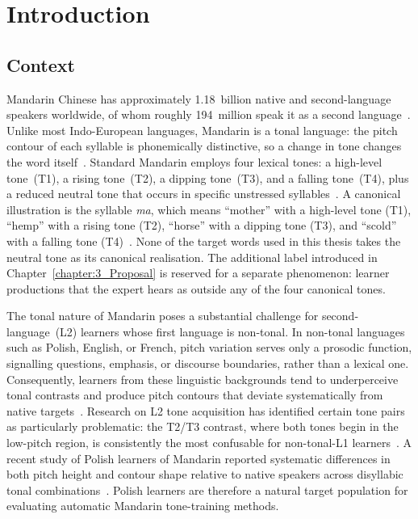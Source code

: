 
\chapter{Introduction}\label{chapter:1_Introduction}

\section{Context}
\label{sec:intro:context}

Mandarin Chinese has approximately 1.18~billion native and second-language speakers worldwide, of whom roughly 194~million speak it as a second language~\cite{ethnologue2025}. Unlike most Indo-European languages, Mandarin is a tonal language: the pitch contour of each syllable is phonemically distinctive, so a change in tone changes the word itself~\cite{jongman2006tones}. Standard Mandarin employs four lexical tones: a high-level tone~(T1), a rising tone~(T2), a dipping tone~(T3), and a falling tone~(T4), plus a reduced neutral tone that occurs in specific unstressed syllables~\cite{zahner2022toneexperience}. A canonical illustration is the syllable \textit{ma}, which means ``mother'' with a high-level tone (T1), ``hemp'' with a rising tone (T2), ``horse'' with a dipping tone (T3), and ``scold'' with a falling tone (T4)~\cite{jongman2006tones}. None of the target words used in this thesis takes the neutral tone as its canonical realisation. The additional label introduced in Chapter~\ref{chapter:3_Proposal} is reserved for a separate phenomenon: learner productions that the expert hears as outside any of the four canonical tones.

The tonal nature of Mandarin poses a substantial challenge for second-language~(L2) learners whose first language is non-tonal. In non-tonal languages such as Polish, English, or French, pitch variation serves only a prosodic function, signalling questions, emphasis, or discourse boundaries, rather than a lexical one. Consequently, learners from these linguistic backgrounds tend to underperceive tonal contrasts and produce pitch contours that deviate systematically from native targets~\cite{hao2012}. Research on L2 tone acquisition has identified certain tone pairs as particularly problematic: the T2/T3 contrast, where both tones begin in the low-pitch region, is consistently the most confusable for non-tonal-L1 learners~\cite{hao2012}. A recent study of Polish learners of Mandarin reported systematic differences in both pitch height and contour shape relative to native speakers across disyllabic tonal combinations~\cite{chu2024statistical}. Polish learners are therefore a natural target population for evaluating automatic Mandarin tone-training methods.

